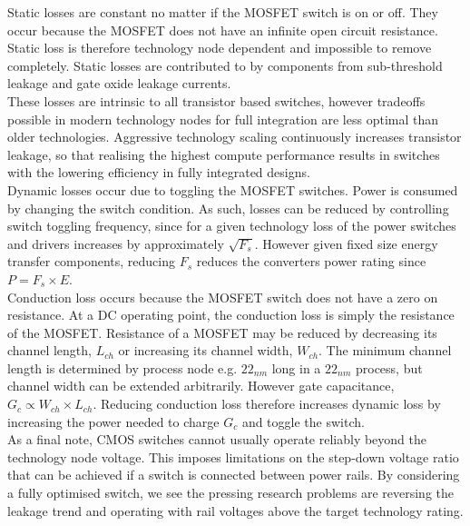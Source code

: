 \documentclass[letterpaper,twocolumn,10pt]{article}
\begin{document}
Static losses are constant no matter if the MOSFET switch is on or off. They occur because the MOSFET does not have an infinite open circuit resistance. Static loss is therefore technology node dependent and impossible to remove completely. Static losses are contributed to by components from sub-threshold leakage and gate oxide leakage currents.\\
These losses are intrinsic to all transistor based switches, however tradeoffs possible in modern technology nodes for full integration are less optimal than older technologies. Aggressive technology scaling continuously increases transistor leakage\cite{Iwai2009}, so that realising the highest compute performance results in switches with the lowering efficiency in fully integrated designs.\\
Dynamic losses occur due to toggling the MOSFET switches. Power is consumed by changing the switch condition. As such, losses can be reduced by controlling switch toggling frequency, since for a given technology loss of the power switches and drivers increases by approximately $\sqrt{F_s}$\cite{Andreou1999}. However given fixed size energy transfer components, reducing $F_s$ reduces the converters power rating since $P = F_s \times E$.\\
Conduction loss occurs because the MOSFET switch does not have a zero on resistance. At a DC operating point, the conduction loss is simply the resistance of the MOSFET. Resistance of a MOSFET may be reduced by decreasing its channel length, $L_{ch}$ or increasing its channel width, $W_{ch}$. The minimum channel length is determined by process node e.g. $22_{nm}$ long in a $22_{nm}$ process, but channel width can be extended arbitrarily. However gate capacitance, $G_c \propto W_{ch} \times L_{ch}$. Reducing conduction loss therefore increases dynamic loss by increasing the power needed to charge $G_c$ and toggle the switch.\\  
\indent As a final note, CMOS switches cannot usually operate reliably beyond the technology node voltage. This imposes limitations on the step-down voltage ratio that can be achieved if a switch is connected between power rails. %
\indent By considering a fully optimised switch, we see the pressing research problems are reversing the leakage trend\cite{Iwai2009} and operating with rail voltages above the target technology rating.\\ 
\end{document}
